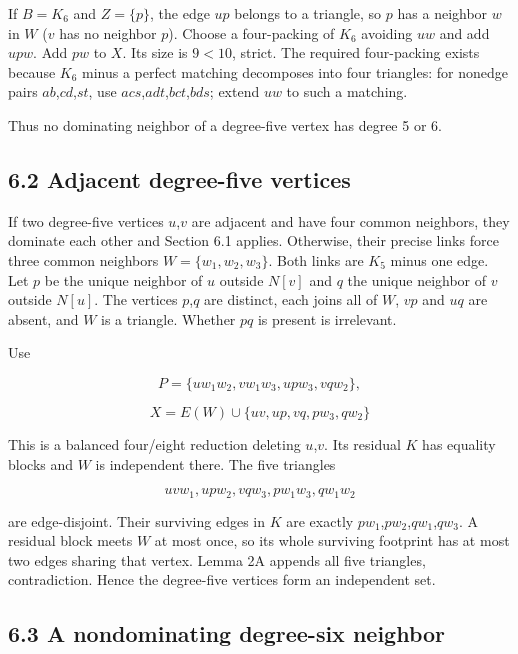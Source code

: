 \documentclass[11pt]{article}
\begin{document}
If \(B=K_6\) and \(Z=\{p\}\), the edge \(up\) belongs to a triangle, so
\(p\) has a neighbor \(w\) in \(W\) (\(v\) has no neighbor \(p\)).
Choose a four-packing of \(K_6\) avoiding \(uw\) and add \(upw\). Add
\(pw\) to \(X\). Its size is \(9<10\), strict. The required four-packing
exists because \(K_6\) minus a perfect matching decomposes into four
triangles: for nonedge pairs \(ab\),\(cd\),\(st\), use
\(acs\),\(adt\),\(bct\),\(bds\); extend \(uw\) to such a matching.

Thus no dominating neighbor of a degree-five vertex has degree 5 or 6.

\subsection{6.2 Adjacent degree-five
vertices}\label{adjacent-degree-five-vertices}

If two degree-five vertices \(u\),\(v\) are adjacent and have four
common neighbors, they dominate each other and Section 6.1 applies.
Otherwise, their precise links force three common neighbors
\(W=\{w_1,w_2,w_3\}\). Both links are \(K_5\) minus one edge. Let \(p\)
be the unique neighbor of \(u\) outside \(N[v]\) and \(q\) the unique
neighbor of \(v\) outside \(N[u]\). The vertices \(p\),\(q\) are
distinct, each joins all of \(W\), \(vp\) and \(uq\) are absent, and
\(W\) is a triangle. Whether \(pq\) is present is irrelevant.

Use

\[P=\{uw_1w_2, vw_1w_3, upw_3, vqw_2\},\]

\[X=E(W)\cup \{uv,up,vq,pw_3,qw_2\}\]

This is a balanced four/eight reduction deleting \(u\),\(v\). Its
residual \(K\) has equality blocks and \(W\) is independent there. The
five triangles

\[uvw_1, upw_2, vqw_3, pw_1w_3, qw_1w_2\]

are edge-disjoint. Their surviving edges in \(K\) are exactly
\(pw_1\),\(pw_2\),\(qw_1\),\(qw_3\). A residual block meets \(W\) at
most once, so its whole surviving footprint has at most two edges
sharing that vertex. Lemma 2A appends all five triangles, contradiction.
Hence the degree-five vertices form an independent set.

\subsection{6.3 A nondominating degree-six
neighbor}\label{a-nondominating-degree-six-neighbor}
\end{document}
